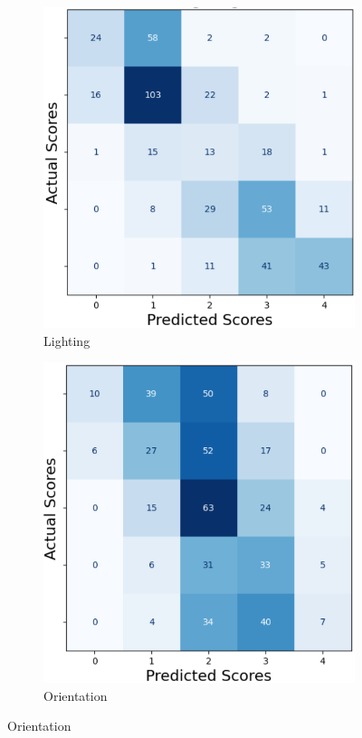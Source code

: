 \begin{figure}[ht]
\begin{subfigure}[b]{0.32\textwidth}
        \includegraphics[width=\textwidth]{img/cm/light.png}
        \caption{Lighting}
        \label{fig:cm_light}
    \end{subfigure}
    \hfill
    \begin{subfigure}[b]{0.32\textwidth}
        \includegraphics[width=\textwidth]{img/cm/orient.png}
        \caption{Orientation}
        \label{fig:cm_orient}
    \end{subfigure} 


\end{figure}
